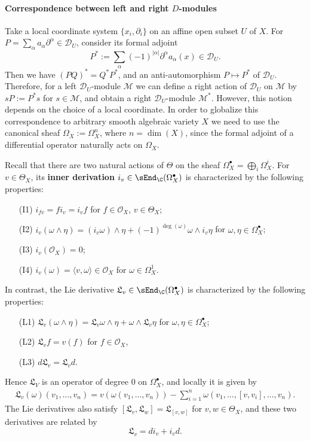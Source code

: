 \paragraph{Correspondence between left and right \texorpdfstring{$D$}{D}-modules}
Take a local coordinate system $\{x_i,\partial_i\}$ on an affine open subset $U$ of $X$. For $P=\sum_\alpha a_\alpha\partial^\alpha\in\mathscr{D}_U$, consider its formal adjoint
\[P^*:=\sum_\alpha(-1)^{|\alpha|}\partial^\alpha a_\alpha(x)\in\mathscr{D}_U.\]
Then we have $(PQ)^*=Q^*P^*$, and an anti-automorphism $P\mapsto P^*$ of $\mathscr{D}_U$. Therefore, for a left $\mathscr{D}_U$-module $\mathscr{M}$ we can define a right action of $\mathscr{D}_U$ on $\mathscr{M}$ by $sP:=P^*s$ for $s\in\mathscr{M}$, and obtain a right $\mathscr{D}_U$-module $\mathscr{M}^*$. However, this notion depends on the choice of a local coordinate. In order to globalize this correspondence to arbitrary smooth algebraic variety $X$ we need to use the canonical sheaf $\Omega_X:=\Omega_X^n$, where $n=\dim(X)$, since the formal adjoint of a differential operator naturally acts on $\Omega_X$.\par
Recall that there are two natural actions of $\Theta$ on the sheaf $\Omega_X^\bullet=\bigoplus_i\Omega_X^i$. For $v\in\Theta_X$, its \textbf{inner derivation} $i_v\in\sEnd_\C(\Omega_X^\bullet)$ is characterized by the following properties:
\begin{enumerate}[leftmargin=40pt]
    \item[(I1)] $i_{fv}=fi_v=i_vf$ for $f\in\mathscr{O}_X$, $v\in\Theta_X$;
    \item[(I2)] $i_v(\omega\wedge\eta)=(i_v\omega)\wedge\eta+(-1)^{\deg(\omega)}\omega\wedge i_v\eta$ for $\omega,\eta\in\Omega_X^\bullet$;
    \item[(I3)] $i_v(\mathscr{O}_X)=0$;
    \item[(I4)] $i_v(\omega)=\langle v,\omega\rangle\in\mathscr{O}_X$ for $\omega\in\Omega_X^1$.
\end{enumerate}
In contrast, the Lie derivative $\mathfrak{L}_v\in\sEnd_\C(\Omega_X^\bullet)$ is characterized by the following properties:
\begin{enumerate}[leftmargin=40pt]
    \item[(L1)] $\mathfrak{L}_v(\omega\wedge\eta)=\mathfrak{L}_v\omega\wedge\eta+\omega\wedge\mathfrak{L}_v\eta$ for $\omega,\eta\in\Omega_X^\bullet$;
    \item[(L2)] $\mathfrak{L}_vf=v(f)$ for $f\in\mathscr{O}_X$,
    \item[(L3)] $d\mathfrak{L}_v=\mathfrak{L}_vd$. 
\end{enumerate}
Hence $\mathfrak{L}_V$ is an operator of degree $0$ on $\Omega_X^\bullet$, and locally it is given by
\begin{align*}
\mathfrak{L}_v(\omega)(v_1,\dots,v_n)=v(\omega(v_1,\dots,v_n))-\sum_{i=1}^{n}\omega(v_1,\dots,[v,v_i],\dots,v_n).
\end{align*}
The Lie derivatives also satisfy $[\mathfrak{L}_v,\mathfrak{L}_w]=\mathfrak{L}_{[v,w]}$ for $v,w\in\Theta_X$, and these two derivatives are related by
\[\mathfrak{L}_v=di_v+i_vd.\]

